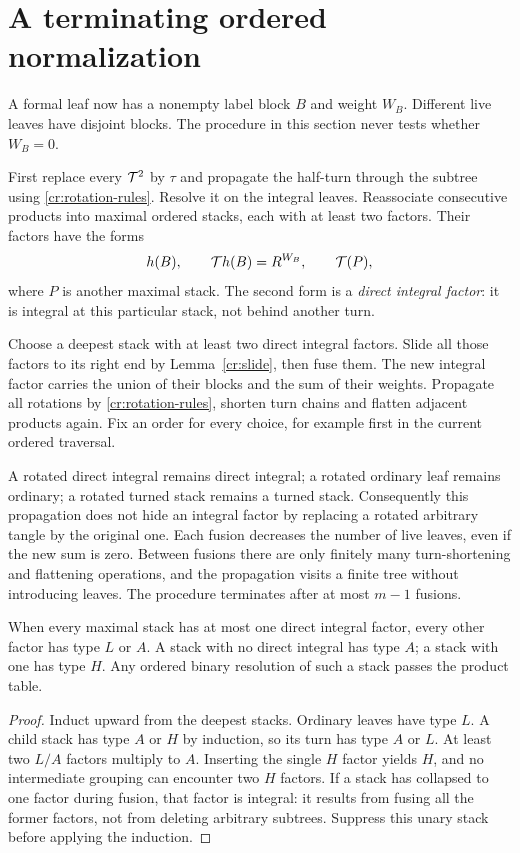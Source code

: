 \section{A terminating ordered normalization}\label{cr:normalization}

A formal leaf now has a nonempty label block $B$ and weight $W_B$. Different live leaves have disjoint blocks. The procedure in this section never tests whether $W_B=0$.

First replace every $\mathcal T^2$ by $\tau$ and propagate the half-turn through the subtree using \eqref{cr:rotation-rules}. Resolve it on the integral leaves. Reassociate consecutive products into maximal ordered stacks, each with at least two factors. Their factors have the forms
\begin{equation}\label{cr:stack-factors}
              h(B),\qquad \mathcal T h(B)=R^{W_B},\qquad \mathcal T(P),
\end{equation}
where $P$ is another maximal stack. The second form is a \emph{direct integral factor}: it is integral at this particular stack, not behind another turn.

Choose a deepest stack with at least two direct integral factors. Slide all those factors to its right end by Lemma~\ref{cr:slide}, then fuse them. The new integral factor carries the union of their blocks and the sum of their weights. Propagate all rotations by \eqref{cr:rotation-rules}, shorten turn chains and flatten adjacent products again. Fix an order for every choice, for example first in the current ordered traversal.

A rotated direct integral remains direct integral; a rotated ordinary leaf remains ordinary; a rotated turned stack remains a turned stack. Consequently this propagation does not hide an integral factor by replacing a rotated arbitrary tangle by the original one. Each fusion decreases the number of live leaves, even if the new sum is zero. Between fusions there are only finitely many turn-shortening and flattening operations, and the propagation visits a finite tree without introducing leaves. The procedure terminates after at most $m-1$ fusions.

\begin{lemma}\label{cr:reduced-stacks}
When every maximal stack has at most one direct integral factor, every other factor has type $L$ or $A$. A stack with no direct integral has type $A$; a stack with one has type $H$. Any ordered binary resolution of such a stack passes the product table.
\end{lemma}
\begin{proof}
Induct upward from the deepest stacks. Ordinary leaves have type $L$. A child stack has type $A$ or $H$ by induction, so its turn has type $A$ or $L$. At least two $L/A$ factors multiply to $A$. Inserting the single $H$ factor yields $H$, and no intermediate grouping can encounter two $H$ factors. If a stack has collapsed to one factor during fusion, that factor is integral: it results from fusing all the former factors, not from deleting arbitrary subtrees. Suppress this unary stack before applying the induction.
\end{proof}

